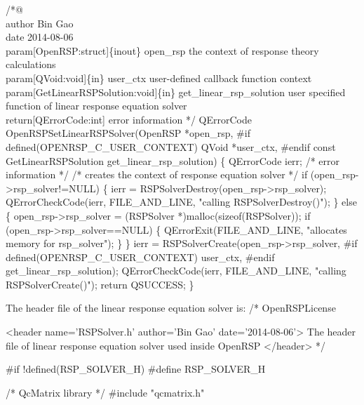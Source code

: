 /*@%
     \\author Bin Gao
     \\date 2014-08-06
     \\param[OpenRSP:struct]\{inout\} open_rsp the context of response theory calculations
     \\param[QVoid:void]\{in\} user_ctx user-defined callback function context
     \\param[GetLinearRSPSolution:void]\{in\} get_linear_rsp_solution user specified
         function of linear response equation solver
     \\return[QErrorCode:int] error information
*/
QErrorCode OpenRSPSetLinearRSPSolver(OpenRSP *open_rsp,
#if defined(OPENRSP_C_USER_CONTEXT)
                                     QVoid *user_ctx,
#endif
                                     const GetLinearRSPSolution get_linear_rsp_solution)
\{
    QErrorCode ierr;  /* error information */
    /* creates the context of response equation solver */
    if (open_rsp->rsp_solver!=NULL) \{
        ierr = RSPSolverDestroy(open_rsp->rsp_solver);
        QErrorCheckCode(ierr, FILE_AND_LINE, "calling RSPSolverDestroy()");
    \}
    else \{
        open_rsp->rsp_solver = (RSPSolver *)malloc(sizeof(RSPSolver));
        if (open_rsp->rsp_solver==NULL) \{
            QErrorExit(FILE_AND_LINE, "allocates memory for rsp_solver");
        \}
    \}
    ierr = RSPSolverCreate(open_rsp->rsp_solver,
#if defined(OPENRSP_C_USER_CONTEXT)
                           user_ctx,
#endif
                           get_linear_rsp_solution);
    QErrorCheckCode(ierr, FILE_AND_LINE, "calling RSPSolverCreate()");
    return QSUCCESS;
\}
\nwendcode{}\nwdocspar

The header file of the linear response equation solver is:
\nwenddocs{}\endmoddef
/*
  \LA{}OpenRSPLicense~{\nwtagstyle{}}\RA{}

  <header name='RSPSolver.h' author='Bin Gao' date='2014-08-06'>
    The header file of linear response equation solver used inside OpenRSP
  </header>
*/

#if !defined(RSP_SOLVER_H)
#define RSP_SOLVER_H

/* QcMatrix library */
#include "qcmatrix.h"

